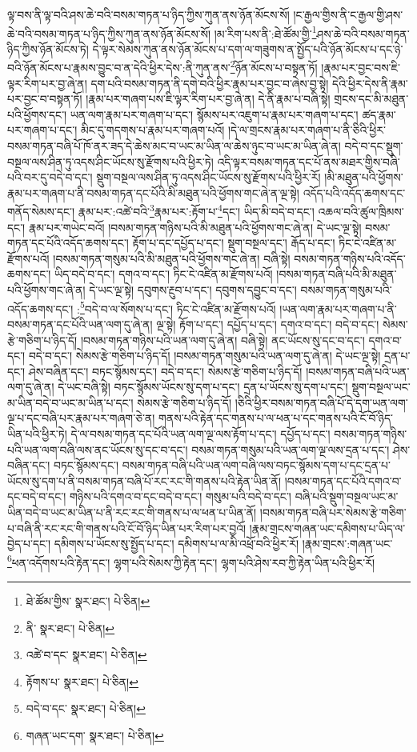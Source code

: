 ལྟ་བས་ནི་ལྟ་བའི་ཤས་ཆེ་བའི་བསམ་གཏན་པ་ཉིད་ཀྱིས་ཀུན་ནས་ཉོན་མོངས་སོ། །ང་རྒྱལ་གྱིས་ནི་ང་རྒྱལ་གྱི་ཤས་ཆེ་བའི་བསམ་གཏན་པ་ཉིད་ཀྱིས་ཀུན་ནས་ཉོན་མོངས་སོ། །མ་རིག་པས་ནི་:ཐེ་ཚོམ་གྱི་\footnote{ཐེ་ཚོམ་གྱིས་  སྣར་ཐང་།  པེ་ཅིན། }ཤས་ཆེ་བའི་བསམ་གཏན་ཉིད་ཀྱིས་ཉོན་མོངས་ཏེ། དེ་ལྟར་སེམས་ཀུན་ནས་ཉོན་མོངས་པ་དག་ལ་གཟུགས་ན་སྤྱོད་པའི་ཉོན་མོངས་པ་དང་ཉེ་བའི་ཉོན་མོངས་པ་རྣམས་བྱུང་བ་ན་དེའི་ཕྱིར་དེས་:ནི་ཀུན་ནས་\footnote{ནི་  སྣར་ཐང་།  པེ་ཅིན། }ཉོན་མོངས་པ་བསྟན་ཏོ། །རྣམ་པར་བྱང་བས་ཇི་ལྟར་རིག་པར་བྱ་ཞེ་ན། དག་པའི་བསམ་གཏན་ནི་དགེ་བའི་ཕྱིར་རྣམ་པར་བྱང་བ་ཞེས་བྱ་སྟེ། དེའི་ཕྱིར་དེས་ནི་རྣམ་པར་བྱང་བ་བསྟན་ཏོ། །རྣམ་པར་གཞག་པས་ཇི་ལྟར་རིག་པར་བྱ་ཞེ་ན། དེ་ནི་རྣམ་པ་བཞི་སྟེ། གྲངས་དང་མི་མཐུན་པའི་ཕྱོགས་དང་། ཡན་ལག་རྣམ་པར་གཞག་པ་དང་། སྙོམས་པར་འཇུག་པ་རྣམ་པར་གཞག་པ་དང་། ཚད་རྣམ་པར་གཞག་པ་དང་། མིང་དུ་གདགས་པ་རྣམ་པར་གཞག་པའོ། །དེ་ལ་གྲངས་རྣམ་པར་གཞག་པ་ནི་ཅིའི་ཕྱིར་བསམ་གཏན་བཞི་པོ་ཁོ་ནར་ཟད་དེ་ཆེས་མང་བ་ཡང་མ་ཡིན་ལ་ཆེས་ཉུང་བ་ཡང་མ་ཡིན་ཞེ་ན། བདེ་བ་དང་སྡུག་བསྔལ་ལས་ཤིན་ཏུ་འདས་ཤིང་ཡོངས་སུ་རྫོགས་པའི་ཕྱིར་ཏེ། འདི་ལྟར་བསམ་གཏན་དང་པོ་ནས་མཐར་གྱིས་བཞི་པའི་བར་དུ་བདེ་བ་དང་། སྡུག་བསྔལ་ལས་ཤིན་ཏུ་འདས་ཤིང་ཡོངས་སུ་རྫོགས་པའི་ཕྱིར་རོ། །མི་མཐུན་པའི་ཕྱོགས་རྣམ་པར་གཞག་པ་ནི་བསམ་གཏན་དང་པོའི་མི་མཐུན་པའི་ཕྱོགས་གང་ཞེ་ན་ལྔ་སྟེ། འདོད་པའི་འདོད་ཆགས་དང་གནོད་སེམས་དང་། རྣམ་པར་:འཚེ་བའི་\footnote{འཚེ་བ་དང་  སྣར་ཐང་།  པེ་ཅིན། }རྣམ་པར་:རྟོག་པ་\footnote{རྟོགས་པ་  སྣར་ཐང་།  པེ་ཅིན། }དང་། ཡིད་མི་བདེ་བ་དང་། འཆལ་བའི་ཚུལ་ཁྲིམས་དང་། རྣམ་པར་གཡེང་བའོ། །བསམ་གཏན་གཉིས་པའི་མི་མཐུན་པའི་ཕྱོགས་གང་ཞེ་ན། དེ་ཡང་ལྔ་སྟེ། བསམ་གཏན་དང་པོའི་འདོད་ཆགས་དང་། རྟོག་པ་དང་དཔྱོད་པ་དང་། སྡུག་བསྔལ་དང་། རྒོད་པ་དང་། ཏིང་ངེ་འཛིན་མ་རྫོགས་པའོ། །བསམ་གཏན་གསུམ་པའི་མི་མཐུན་པའི་ཕྱོགས་གང་ཞེ་ན། བཞི་སྟེ། བསམ་གཏན་གཉིས་པའི་འདོད་ཆགས་དང་། ཡིད་བདེ་བ་དང་། དགའ་བ་དང་། ཏིང་ངེ་འཛིན་མ་རྫོགས་པའོ། །བསམ་གཏན་བཞི་པའི་མི་མཐུན་པའི་ཕྱོགས་གང་ཞེ་ན། དེ་ཡང་ལྔ་སྟེ། དབུགས་རྔུབ་པ་དང་། དབུགས་དབྱུང་བ་དང་། བསམ་གཏན་གསུམ་པའི་འདོད་ཆགས་དང་། :\footnote{བདེ་བ་དང་  སྣར་ཐང་།  པེ་ཅིན། }བདེ་བ་ལ་སོགས་པ་དང་། ཏིང་ངེ་འཛིན་མ་རྫོགས་པའོ། །ཡན་ལག་རྣམ་པར་གཞག་པ་ནི་བསམ་གཏན་དང་པོའི་ཡན་ལག་དུ་ཞེ་ན། ལྔ་སྟེ། རྟོག་པ་དང་། དཔྱོད་པ་དང་། དགའ་བ་དང་། བདེ་བ་དང་། སེམས་རྩེ་གཅིག་པ་ཉིད་དོ། །བསམ་གཏན་གཉིས་པའི་ཡན་ལག་དུ་ཞེ་ན། བཞི་སྟེ། ནང་ཡོངས་སུ་དང་བ་དང་། དགའ་བ་དང་། བདེ་བ་དང་། སེམས་རྩེ་གཅིག་པ་ཉིད་དོ། །བསམ་གཏན་གསུམ་པའི་ཡན་ལག་དུ་ཞེ་ན། དེ་ཡང་ལྔ་སྟེ། དྲན་པ་དང་། ཤེས་བཞིན་དང་། བཏང་སྙོམས་དང་། བདེ་བ་དང་། སེམས་རྩེ་གཅིག་པ་ཉིད་དོ། །བསམ་གཏན་བཞི་པའི་ཡན་ལག་དུ་ཞེ་ན། དེ་ཡང་བཞི་སྟེ། བཏང་སྙོམས་ཡོངས་སུ་དག་པ་དང་། དྲན་པ་ཡོངས་སུ་དག་པ་དང་། སྡུག་བསྔལ་ཡང་མ་ཡིན་བདེ་བ་ཡང་མ་ཡིན་པ་དང་། སེམས་རྩེ་གཅིག་པ་ཉིད་དོ། །ཅིའི་ཕྱིར་བསམ་གཏན་བཞི་པོ་དེ་དག་ཡན་ལག་ལྔ་པ་དང་བཞི་པར་རྣམ་པར་གཞག་ཅེ་ན། གནས་པའི་རྟེན་དང་གནས་པ་ལ་ཕན་པ་དང་གནས་པའི་ངོ་བོ་ཉིད་ཡིན་པའི་ཕྱིར་ཏེ། དེ་ལ་བསམ་གཏན་དང་པོའི་ཡན་ལག་ལྔ་ལས་རྟོག་པ་དང་། དཔྱོད་པ་དང་། བསམ་གཏན་གཉིས་པའི་ཡན་ལག་བཞི་ལས་ནང་ཡོངས་སུ་དང་བ་དང་། བསམ་གཏན་གསུམ་པའི་ཡན་ལག་ལྔ་ལས་དྲན་པ་དང་། ཤེས་བཞིན་དང་། བཏང་སྙོམས་དང་། བསམ་གཏན་བཞི་པའི་ཡན་ལག་བཞི་ལས་བཏང་སྙོམས་དག་པ་དང་དྲན་པ་ཡོངས་སུ་དག་པ་ནི་བསམ་གཏན་བཞི་པོ་རང་རང་གི་གནས་པའི་རྟེན་ཡིན་ནོ། །བསམ་གཏན་དང་པོའི་དགའ་བ་དང་བདེ་བ་དང་། གཉིས་པའི་དགའ་བ་དང་བདེ་བ་དང་། གསུམ་པའི་བདེ་བ་དང་། བཞི་པའི་སྡུག་བསྔལ་ཡང་མ་ཡིན་བདེ་བ་ཡང་མ་ཡིན་པ་ནི་རང་རང་གི་གནས་པ་ལ་ཕན་པ་ཡིན་ནོ། །བསམ་གཏན་བཞི་པར་སེམས་རྩེ་གཅིག་པ་བཞི་ནི་རང་རང་གི་གནས་པའི་ངོ་བོ་ཉིད་ཡིན་པར་རིག་པར་བྱའོ། །རྣམ་གྲངས་གཞན་ཡང་དམིགས་པ་ཡིད་ལ་བྱེད་པ་དང་། དམིགས་པ་ཡོངས་སུ་སྤྱོད་པ་དང་། དམིགས་པ་ལ་མི་འཕྲོ་བའི་ཕྱིར་རོ། །རྣམ་གྲངས་:གཞན་ཡང་\footnote{གཞན་ཡང་དག་  སྣར་ཐང་།  པེ་ཅིན། }ཕན་འདོགས་པའི་རྟེན་དང་། ལྷག་པའི་སེམས་ཀྱི་རྟེན་དང་། ལྷག་པའི་ཤེས་རབ་ཀྱི་རྟེན་ཡིན་པའི་ཕྱིར་རོ། 